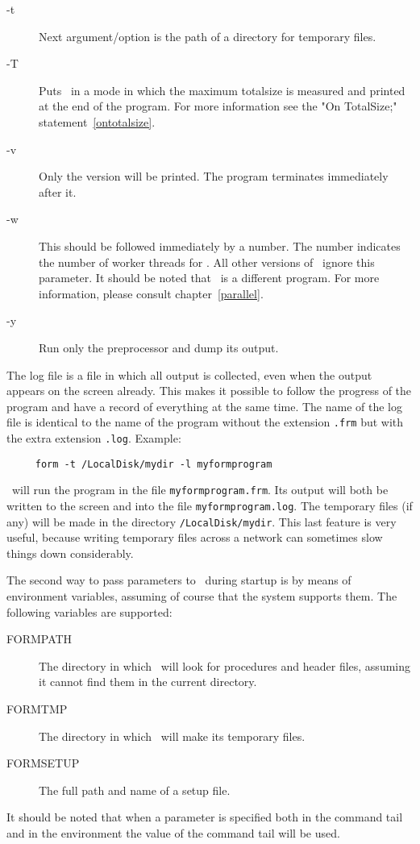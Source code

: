 \begin{description}
\item[-t] Next argument/option is the path of a directory for temporary files.
\item[-T] Puts \FORM\ in a mode in which the maximum 
     totalsize is measured and printed at the end of the program. For more 
     information see the "On TotalSize;" statement~\ref{ontotalsize}.
\item[-v] Only the version will be printed. The program terminates 
     immediately after it.
\item[-w] This should be followed immediately by a number. The 
     number indicates the number of worker threads for \TFORM. All other 
     versions of \FORM\ ignore this parameter. It should be noted that \TFORM\ 
     is a different program. For more information, please consult 
     chapter~\ref{parallel}.
\item[-y] Run only the preprocessor and dump its output.
\end{description}

\noindent The log file is a file in which all 
output is collected, even when the output appears on the screen already. 
This makes it possible to follow the progress of the program and have a 
record of everything at the same time. The name of the log file is 
identical to the name of the program without the extension \verb:.frm: but 
with the extra extension \verb:.log:.
Example:
\begin{center}
\begin{verbatim}
     form -t /LocalDisk/mydir -l myformprogram
\end{verbatim}
\end{center}
\FORM\ will run the program in the file \verb:myformprogram.frm:. Its output 
will both be written to the screen and into the file 
\verb:myformprogram.log:. The temporary files (if any) will be made in the 
directory \verb:/LocalDisk/mydir:. This last feature is very useful, 
because writing temporary files across a network can sometimes slow things 
down considerably.

The second way to pass parameters to \FORM\ during startup is by means of 
environment\index{environment variables} variables, assuming of course that 
the system supports them. The following variables are supported:
\begin{description}
\item[FORMPATH] The directory in which \FORM\ will look for 
procedures and header files, assuming it cannot find them in the current 
directory.
\item[FORMTMP] The directory in which \FORM\ will make its 
temporary files\index{file!temporary}.
\item[FORMSETUP] The full path and name of a setup 
file\index{file!setup}.
\end{description}
It should be noted that when a parameter is specified both in the command 
tail and in the environment the value of the command tail will be used.

